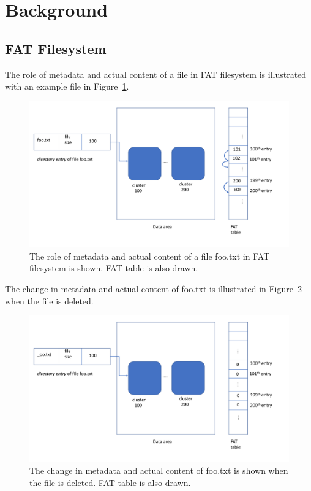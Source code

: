 \section{Background}


\subsection{FAT Filesystem}

The role of metadata and actual content of a file in FAT filesystem is illustrated with an example file in Figure~\ref{fig:fat1}.

\begin{figure}[h]
    \centering
    \includegraphics[width=\linewidth]{fig/fat1.pdf}
    \caption{The role of metadata and actual content of a file foo.txt in FAT filesystem is shown. FAT table is also drawn.}
    \label{fig:fat1}
\end{figure}


The change in metadata and actual content of foo.txt is illustrated in Figure~\ref{fig:fat2} when the file is deleted.

\begin{figure}[h]
    \centering
    \includegraphics[width=\linewidth]{fig/fat2.pdf}
    \caption{The change in metadata and actual content of foo.txt is shown when the file is deleted. FAT table is also drawn.}
    \label{fig:fat2}
\end{figure}

